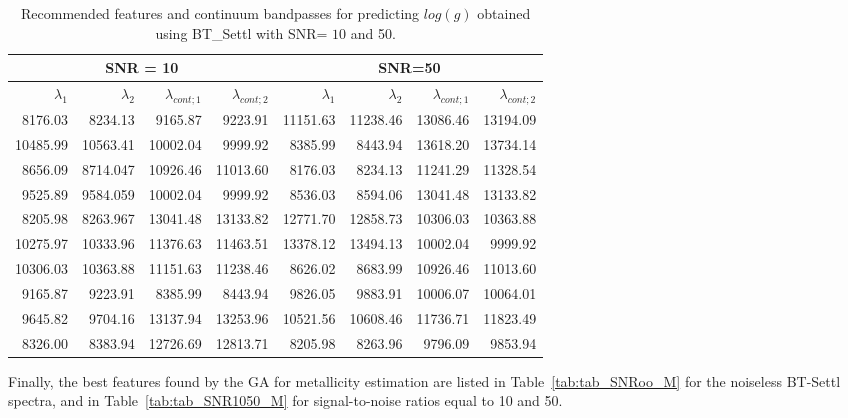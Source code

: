 \begin{table}
\begin{center}
\begin{tabular}{rrrr | rrrr}
  \hline
 \multicolumn{4}{c}{SNR = 10} &  \multicolumn{4}{c}{SNR=50} \\
  \hline
$\lambda_1$ & $\lambda_2$ & $\lambda_{cont;1}$ & $\lambda_{cont;2} $ & $\lambda_1$ & $\lambda_2$ & $\lambda_{cont;1}$ & $\lambda_{cont;2} $ \\ 
  \hline
     8176.03  & 8234.13  &	9165.87  & 9223.91  &  11151.63 & 11238.46 &      13086.46 & 13194.09 \\
     10485.99 & 10563.41 &	10002.04 & 9999.92  &  8385.99  & 8443.94  &      13618.20 & 13734.14 \\
     8656.09  & 8714.047 &      10926.46 & 11013.60 &  8176.03  & 8234.13  &      11241.29 & 11328.54 \\
     9525.89  & 9584.059 &	10002.04 & 9999.92  &  8536.03  & 8594.06  &      13041.48 & 13133.82 \\ 
     8205.98  & 8263.967 &	13041.48 & 13133.82 &  12771.70 & 12858.73 &      10306.03 & 10363.88 \\
     10275.97 & 10333.96 &	11376.63 & 11463.51 &  13378.12 & 13494.13 &      10002.04 & 9999.92  \\
     10306.03 & 10363.88 &	11151.63 & 11238.46 &  8626.02  & 8683.99  &      10926.46 & 11013.60 \\
     9165.87  & 9223.91  &	8385.99  & 8443.94  &  9826.05  & 9883.91  &      10006.07 & 10064.01 \\
     9645.82  & 9704.16  &	13137.94 & 13253.96 &  10521.56 & 10608.46 &      11736.71 & 11823.49 \\
     8326.00  & 8383.94  &	12726.69 & 12813.71 &  8205.98  & 8263.96  &      9796.09  & 9853.94  \\ 
   \hline
\end{tabular}
\caption {Recommended features and continuum bandpasses for predicting $log(g)$ 
      obtained using BT\_Settl with SNR= $10$ and
      50.} \label{tab:tab_SNR1050_G}
\end{center}
\end{table}


Finally, the best features found by the GA for metallicity estimation
are listed in Table~\ref{tab:tab_SNRoo_M} for the noiseless BT-Settl
spectra, and in Table~\ref{tab:tab_SNR1050_M} for signal-to-noise
ratios equal to 10 and 50.

